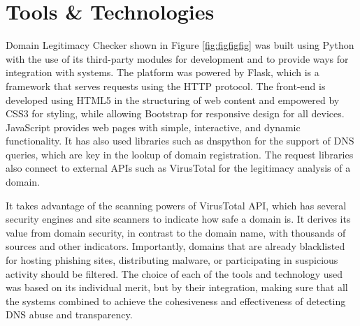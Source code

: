 \section{Tools \& Technologies}

Domain Legitimacy Checker shown in Figure \ref{fig:figfigfig} was built using Python with the use of its third-party modules for development and to provide ways for integration with systems. The platform was powered by Flask, which is a framework that serves requests using the HTTP protocol. The front-end is developed using HTML5 in the structuring of web content and empowered by CSS3 for styling, while allowing Bootstrap for responsive design for all devices. JavaScript provides web pages with simple, interactive, and dynamic functionality. It has also used libraries such as dnspython for the support of DNS queries, which are key in the lookup of domain registration. The request libraries also connect to external APIs such as VirusTotal for the legitimacy analysis of a domain.


It takes advantage of the scanning powers of VirusTotal API, which has several security engines and site scanners to indicate how safe a domain is. It derives its value from domain security, in contrast to the domain name, with thousands of sources and other indicators. Importantly, domains that are already blacklisted for hosting phishing sites, distributing malware, or participating in suspicious activity should be filtered. The choice of each of the tools and technology used was based on its individual merit, but by their integration, making sure that all the systems combined to achieve the cohesiveness and effectiveness of detecting DNS abuse and transparency.



